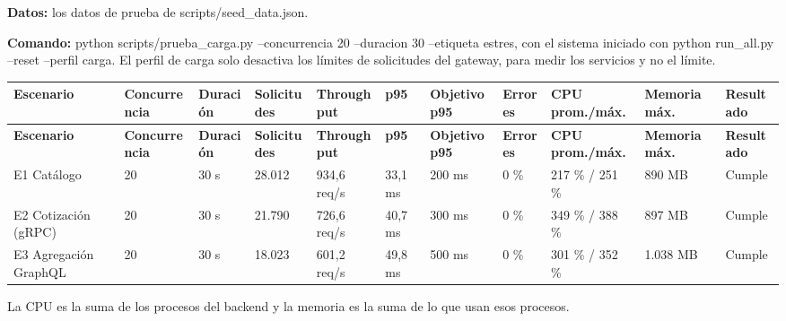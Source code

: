 \documentclass[10pt,letterpaper]{article}
\begin{document}
\textbf{Datos:} los datos de prueba de scripts/\allowbreak{}seed\_\allowbreak{}data.\allowbreak{}json.

\textbf{Comando:} python scripts/\allowbreak{}prueba\_\allowbreak{}carga.\allowbreak{}py --concurrencia 20 --duracion 30 --etiqueta estres, con el sistema iniciado con python run\_\allowbreak{}all.\allowbreak{}py --reset --perfil carga. El perfil de carga solo desactiva los límites de solicitudes del gateway, para medir los servicios y no el límite.

\begin{landscape}
{\scriptsize
\begin{longtable}{|P{\tabcolsep\relax}|P{\tabcolsep\relax}|P{\tabcolsep\relax}|P{\tabcolsep\relax}|P{\tabcolsep\relax}|P{\tabcolsep\relax}|P{\tabcolsep\relax}|P{\tabcolsep\relax}|P{\tabcolsep\relax}|P{\tabcolsep\relax}|P{\tabcolsep\relax}|}
\hline
\textbf{Escenario} & \textbf{Concurrencia} & \textbf{Duración} & \textbf{Solicitudes} & \textbf{Throughput} & \textbf{p95} & \textbf{Objetivo p95} & \textbf{Errores} & \textbf{CPU prom./\allowbreak{}máx.} & \textbf{Memoria máx.} & \textbf{Resultado} \\ \hline
\endfirsthead
\hline
\textbf{Escenario} & \textbf{Concurrencia} & \textbf{Duración} & \textbf{Solicitudes} & \textbf{Throughput} & \textbf{p95} & \textbf{Objetivo p95} & \textbf{Errores} & \textbf{CPU prom./\allowbreak{}máx.} & \textbf{Memoria máx.} & \textbf{Resultado} \\ \hline
\endhead
E1 Catálogo & 20 & 30 s & 28.012 & 934,\allowbreak{}6 req/\allowbreak{}s & 33,\allowbreak{}1 ms & 200 ms & 0 \% & 217 \% /\allowbreak{} 251 \% & 890 MB & Cumple \\ \hline
E2 Cotización (gRPC) & 20 & 30 s & 21.790 & 726,\allowbreak{}6 req/\allowbreak{}s & 40,\allowbreak{}7 ms & 300 ms & 0 \% & 349 \% /\allowbreak{} 388 \% & 897 MB & Cumple \\ \hline
E3 Agregación GraphQL & 20 & 30 s & 18.023 & 601,\allowbreak{}2 req/\allowbreak{}s & 49,\allowbreak{}8 ms & 500 ms & 0 \% & 301 \% /\allowbreak{} 352 \% & 1.038 MB & Cumple \\ \hline
\end{longtable}}
\end{landscape}
La CPU es la suma de los procesos del backend  y la memoria es la suma de lo que usan esos procesos.
\end{document}
